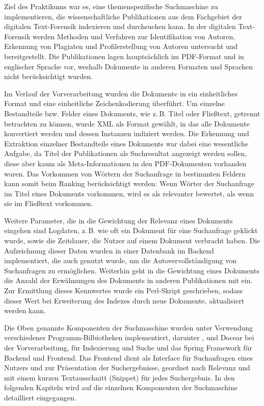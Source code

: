 Ziel des Praktikums war es, eine themenspezifische Suchmaschine zu
implementieren, die wissenschaftliche Publikationen aus dem Fachgebiet
der digitalen Text-Forensik indexieren und durchsuchen kann. In der
digitalen Text-Forensik werden Methoden und Verfahren zur
Identifikation von Autoren, Erkennung von Plagiaten und
Profilerstellung von Autoren untersucht und bereitgestellt. Die
Publikationen lagen hauptsächlich im PDF-Format und in englischer
Sprache vor, weshalb Dokumente in anderen Formaten und Sprachen nicht
berücksichtigt wurden.

Im Verlauf der Vorverarbeitung wurden die Dokumente in ein
einheitliches Format und eine einheitliche Zeichenkodierung überführt.
Um einzelne Bestandteile bzw. Felder eines Dokuments, wie z.\,B. Titel
oder Fließtext, getrennt betrachten zu können, wurde XML als Format
gewählt, in das alle Dokumente konvertiert werden und dessen Instanzen
indiziert werden.  Die Erkennung und Extraktion einzelner Bestandteile eines
Dokuments war dabei eine wesentliche Aufgabe, da Titel der
Publikationen als Suchresultat angezeigt werden sollen, diese aber
kaum als Meta-Informationen in den PDF-Dokumenten vorhanden waren.
Das Vorkommen von Wörtern der Suchanfrage in bestimmten Feldern kann
somit beim Ranking berücksichtigt werden: Wenn Wörter der Suchanfrage
im Titel eines Dokuments vorkommen, wird es als relevanter bewertet,
als wenn sie im Fließtext vorkommen.

Weitere Parameter, die in die Gewichtung der Relevanz eines Dokuments
eingehen sind Logdaten, z.\,B. wie oft ein Dokument für eine Suchanfrage
geklickt wurde, sowie die Zeitdauer, die Nutzer auf einem Dokument
verbracht haben.  Die Aufzeichnung dieser Daten wurden in einer
Datenbank im Backend implementiert, die auch genutzt wurde, um die
Autovervollständigung von Suchanfragen zu ermöglichen.  Weiterhin geht
in die Gewichtung eines Dokuments die Anzahl der Erwähnungen des
Dokuments in anderen Publikationen mit ein.  Zur Ermittlung dieses
Kennwertes wurde ein Perl-Skript geschrieben, sodass dieser Wert bei
Erweiterung des Indexes durch neue Dokumente, aktualisiert werden
kann.

Die Oben genannte Komponenten der Suchmaschine wurden unter Verwendung
verschiedener Programm-Bilbiotheken implementiert, darunter \pdfbox,
\tika und Docear bei der Vorverarbeitung, \lucene für
Indexierung und Suche und das Spring Framework für Backend und
Frontend.  Das Frontend dient als Interface für Suchanfragen eines
Nutzers und zur Präsentation der Suchergebnisse, geordnet nach
Relevanz und mit einem kurzen Textausschnitt (Snippet) für jedes
Suchergebnis.  In den folgenden Kapiteln wird auf die einzelnen
Komponenten der Suchmaschine detailliert eingegangen.

